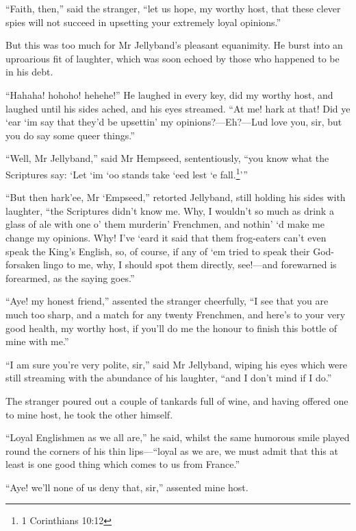 \enquote{Faith, then,} said the stranger, \enquote{let us hope, my worthy host, that these clever spies will not succeed in upsetting your extremely loyal opinions.}

But this was too much for Mr Jellyband's pleasant equanimity. He burst into an uproarious fit of laughter, which was soon echoed by those who happened to be in his debt.

\enquote{Hahaha! hohoho! hehehe!} He laughed in every key, did my worthy host, and laughed until his sides ached, and his eyes streamed. \enquote{At me! hark at that! Did ye `ear `im say that they'd be upsettin’ my opinions?---Eh?---Lud love you, sir, but you do say some queer things.}

\enquote{Well, Mr Jellyband,} said Mr Hempseed, sententiously, \enquote{you know what the Scriptures say: \enquote{Let `im `oo stands take `eed lest `e fall.\footnote{1 Corinthians 10:12}}}

\enquote{But then hark'ee, Mr `Empseed,} retorted Jellyband, still holding his sides with laughter, \enquote{the Scriptures didn't know me. Why, I wouldn't so much as drink a glass of ale with one o’ them murderin’ Frenchmen, and nothin’ `d make me change my opinions. Why! I've `eard it said that them frog-eaters can't even speak the King's English, so, of course, if any of `em tried to speak their God-forsaken lingo to me, why, I should spot them directly, see!---and forewarned is forearmed, as the saying goes.}

\enquote{Aye! my honest friend,} assented the stranger cheerfully, \enquote{I see that you are much too sharp, and a match for any twenty Frenchmen, and here's to your very good health, my worthy host, if you'll do me the honour to finish this bottle of mine with me.}

\enquote{I am sure you're very polite, sir,} said Mr Jellyband, wiping his eyes which were still streaming with the abundance of his laughter, \enquote{and I don't mind if I do.}

The stranger poured out a couple of tankards full of wine, and having offered one to mine host, he took the other himself.

\enquote{Loyal Englishmen as we all are,} he said, whilst the same humorous smile played round the corners of his thin lips---\enquote{loyal as we are, we must admit that this at least is one good thing which comes to us from France.}

\enquote{Aye! we'll none of us deny that, sir,} assented mine host.

